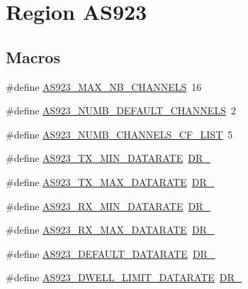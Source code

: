 \hypertarget{group__REGIONAS923}{}\section{Region A\+S923}
\label{group__REGIONAS923}
\subsection*{Macros}
\begin{DoxyCompactItemize}
\item 
\#define \hyperlink{group__REGIONAS923_ga02e3db7e4557dbf77db79285d38dc33e}{A\+S923\+\_\+\+M\+A\+X\+\_\+\+N\+B\+\_\+\+C\+H\+A\+N\+N\+E\+LS}~16
\item 
\#define \hyperlink{group__REGIONAS923_ga189fa7f36943ed53424ac7610ef64d56}{A\+S923\+\_\+\+N\+U\+M\+B\+\_\+\+D\+E\+F\+A\+U\+L\+T\+\_\+\+C\+H\+A\+N\+N\+E\+LS}~2
\item 
\#define \hyperlink{group__REGIONAS923_gaeb64b3a7da759d5e403f08bbacdb8cf8}{A\+S923\+\_\+\+N\+U\+M\+B\+\_\+\+C\+H\+A\+N\+N\+E\+L\+S\+\_\+\+C\+F\+\_\+\+L\+I\+ST}~5
\item 
\#define \hyperlink{group__REGIONAS923_gab6f2badbf9a4eb4038301759c0f7fc77}{A\+S923\+\_\+\+T\+X\+\_\+\+M\+I\+N\+\_\+\+D\+A\+T\+A\+R\+A\+TE}~\hyperlink{group__REGION_ga6c4ef966b4f3d5eb7597b087f2b97095}{D\+R\+\_}
\item 
\#define \hyperlink{group__REGIONAS923_gac9506097a516f03c7c86432d30e8f499}{A\+S923\+\_\+\+T\+X\+\_\+\+M\+A\+X\+\_\+\+D\+A\+T\+A\+R\+A\+TE}~\hyperlink{group__REGION_ga3a06805baf4f00911a3a5d3dbadebf61}{D\+R\+\_}
\item 
\#define \hyperlink{group__REGIONAS923_ga55aa4a1054571ef315043248599e1c96}{A\+S923\+\_\+\+R\+X\+\_\+\+M\+I\+N\+\_\+\+D\+A\+T\+A\+R\+A\+TE}~\hyperlink{group__REGION_ga6c4ef966b4f3d5eb7597b087f2b97095}{D\+R\+\_}
\item 
\#define \hyperlink{group__REGIONAS923_ga008298ea3d2b2444dcad3dedca7189bc}{A\+S923\+\_\+\+R\+X\+\_\+\+M\+A\+X\+\_\+\+D\+A\+T\+A\+R\+A\+TE}~\hyperlink{group__REGION_ga3a06805baf4f00911a3a5d3dbadebf61}{D\+R\+\_}
\item 
\#define \hyperlink{group__REGIONAS923_ga643615d49b742b49b442da9803b9c291}{A\+S923\+\_\+\+D\+E\+F\+A\+U\+L\+T\+\_\+\+D\+A\+T\+A\+R\+A\+TE}~\hyperlink{group__REGION_gad402daa928a8b3dea829315fab69de17}{D\+R\+\_}
\item 
\#define \hyperlink{group__REGIONAS923_gab4d42ec6203089aa346cd55d90eb769e}{A\+S923\+\_\+\+D\+W\+E\+L\+L\+\_\+\+L\+I\+M\+I\+T\+\_\+\+D\+A\+T\+A\+R\+A\+TE}~\hyperlink{group__REGION_gad402daa928a8b3dea829315fab69de17}{D\+R\+\_}

\end{DoxyCompactItemize}
